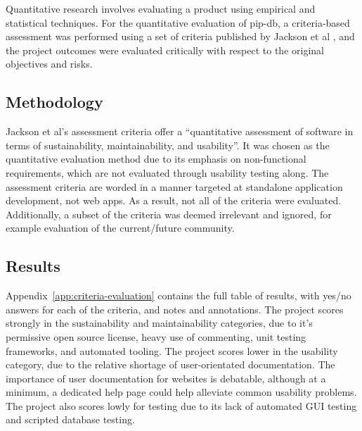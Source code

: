 Quantitative research involves evaluating a product using empirical
and statistical techniques. For the quantitative evaluation of pip-db,
a criteria-based assessment was performed using a set of criteria
published by Jackson et al \cite{jackson2011evaluation}, and the
project outcomes were evaluated critically with respect to the
original objectives and risks.

\subsection{Methodology}

Jackson et al's assessment criteria offer a ``quantitative assessment
of software in terms of sustainability, maintainability, and
usability''. It was chosen as the quantitative evaluation method due
to its emphasis on non-functional requirements, which are not
evaluated through usability testing along. The assessment criteria are
worded in a manner targeted at standalone application development, not
web apps. As a result, not all of the criteria were
evaluated. Additionally, a subset of the criteria was deemed
irrelevant and ignored, for example evaluation of the current/future
community.

\subsection{Results}

Appendix~\ref{app:criteria-evaluation} contains the full table of
results, with yes/no answers for each of the criteria, and notes and
annotations. The project scores strongly in the sustainability and
maintainability categories, due to it's permissive open source
license, heavy use of commenting, unit testing frameworks, and
automated tooling. The project scores lower in the usability category,
due to the relative shortage of user-orientated documentation. The
importance of user documentation for websites is debatable, although
at a minimum, a dedicated help page could help alleviate common
usability problems. The project also scores lowly for testing due to
its lack of automated GUI testing and scripted database testing.



